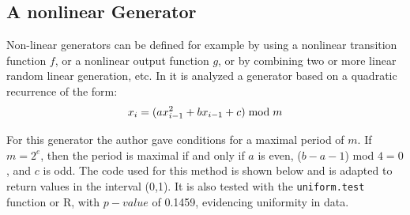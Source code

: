 \documentclass[10pt,leter,openany]{article}
\begin{document}
	\subsection{A nonlinear Generator}

		 Non-linear generators can be defined for example by using a nonlinear transition function $ f $, or a nonlinear output function $g$, or by combining two or more linear random linear generation, etc. In \citet{knuth2014art} it is analyzed a generator based on a quadratic recurrence of the form:
		 \begin{equation*}
		 	x_{i} = (ax_{i-1}^{2} + bx_{i-1} + c) \hspace{0.1cm}\text{mod} \hspace{0.1cm}  m
		 \end{equation*}
	 
		  
		  For this generator the author gave conditions for a maximal period of $m$. If  $m=2^{e}$, then the period is maximal if and only if $a$ is even, ($b-a-1$) mod $4 = 0$, and $c$ is odd. The code used for this method is shown below and  is adapted  to return values in the interval (0,1). It is also tested with the \texttt{uniform.test} function or R, with $p-value$ of 0.1459, evidencing uniformity in data.
 
	

 \clearpage

	
	
	
\end{document}
